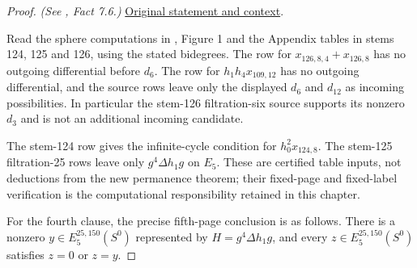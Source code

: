 \begin{proof}
\textit{(See \cite{LWX126}, Fact 7.6.)} \href{paper/main.tex.html#L2156}{Original statement and context}.

Read the sphere computations in \cite{LWX126}, Figure 1 and the Appendix tables in stems 124, 125 and 126, using the stated bidegrees. The row for $x_{126,8,4}+x_{126,8}$ has no outgoing differential before $d_6$. The row for $h_1h_4x_{109,12}$ has no outgoing differential, and the source rows leave only the displayed $d_6$ and $d_{12}$ as incoming possibilities. In particular the stem-126 filtration-six source supports its nonzero $d_3$ and is not an additional incoming candidate.

The stem-124 row gives the infinite-cycle condition for $h_0^2x_{124,8}$. The stem-125 filtration-25 rows leave only $g^4\Delta h_1g$ on $E_5$. These are certified table inputs, not deductions from the new permanence theorem; their fixed-page and fixed-label verification is the computational responsibility retained in this chapter.

For the fourth clause, the precise fifth-page conclusion is as follows.
There is a nonzero $y\in E_5^{25,150}(S^0)$ represented by $H=g^4\Delta h_1g$, and every $z\in E_5^{25,150}(S^0)$ satisfies $z=0$ or $z=y$.
\end{proof}


